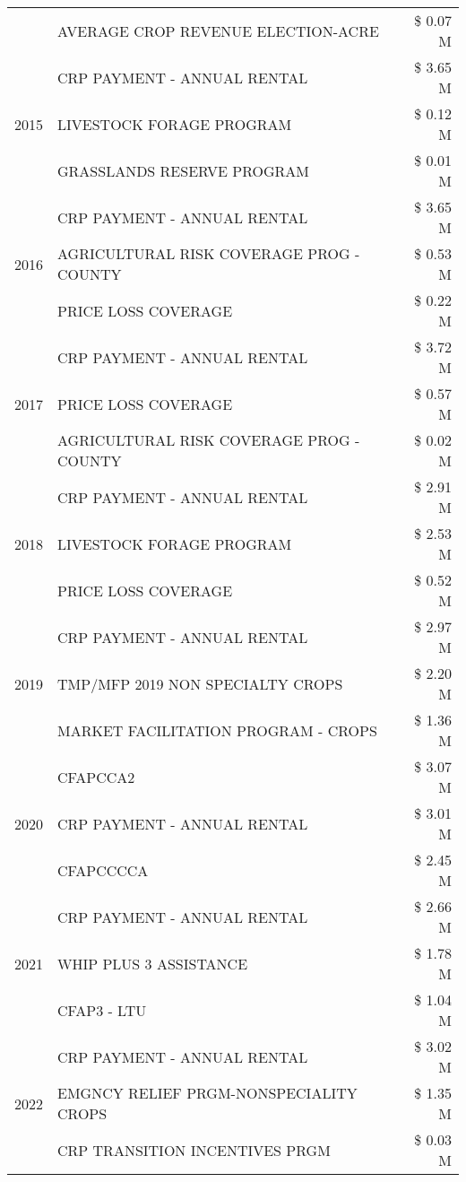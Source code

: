\begin{tabular}{llr}
 & AVERAGE CROP REVENUE ELECTION-ACRE & \$ 0.07 M \\
\cline{1-3}
\multirow[t]{3}{*}{2015} & CRP PAYMENT - ANNUAL RENTAL & \$ 3.65 M \\
 & LIVESTOCK FORAGE PROGRAM & \$ 0.12 M \\
 & GRASSLANDS RESERVE PROGRAM & \$ 0.01 M \\
\cline{1-3}
\multirow[t]{3}{*}{2016} & CRP PAYMENT - ANNUAL RENTAL & \$ 3.65 M \\
 & AGRICULTURAL RISK COVERAGE PROG - COUNTY & \$ 0.53 M \\
 & PRICE LOSS COVERAGE & \$ 0.22 M \\
\cline{1-3}
\multirow[t]{3}{*}{2017} & CRP PAYMENT - ANNUAL RENTAL & \$ 3.72 M \\
 & PRICE LOSS COVERAGE & \$ 0.57 M \\
 & AGRICULTURAL RISK COVERAGE PROG - COUNTY & \$ 0.02 M \\
\cline{1-3}
\multirow[t]{3}{*}{2018} & CRP PAYMENT - ANNUAL RENTAL & \$ 2.91 M \\
 & LIVESTOCK FORAGE PROGRAM & \$ 2.53 M \\
 & PRICE LOSS COVERAGE & \$ 0.52 M \\
\cline{1-3}
\multirow[t]{3}{*}{2019} & CRP PAYMENT - ANNUAL RENTAL & \$ 2.97 M \\
 & TMP/MFP 2019 NON SPECIALTY CROPS & \$ 2.20 M \\
 & MARKET FACILITATION PROGRAM - CROPS & \$ 1.36 M \\
\cline{1-3}
\multirow[t]{3}{*}{2020} & CFAPCCA2 & \$ 3.07 M \\
 & CRP PAYMENT - ANNUAL RENTAL & \$ 3.01 M \\
 & CFAPCCCCA & \$ 2.45 M \\
\cline{1-3}
\multirow[t]{3}{*}{2021} & CRP PAYMENT - ANNUAL RENTAL & \$ 2.66 M \\
 & WHIP PLUS 3 ASSISTANCE & \$ 1.78 M \\
 & CFAP3 - LTU & \$ 1.04 M \\
\cline{1-3}
\multirow[t]{3}{*}{2022} & CRP PAYMENT - ANNUAL RENTAL & \$ 3.02 M \\
 & EMGNCY RELIEF PRGM-NONSPECIALITY CROPS & \$ 1.35 M \\
 & CRP TRANSITION INCENTIVES PRGM & \$ 0.03 M \\
\cline{1-3}
\bottomrule
\end{tabular}
